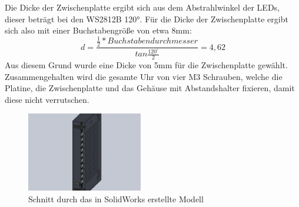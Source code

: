\documentclass[12pt,journal,compsoc]{IEEEtran}
\begin{document}
Die Dicke der Zwischenplatte ergibt sich aus dem Abstrahlwinkel der LEDs, dieser beträgt bei den WS2812B 120°. Für die Dicke der Zwischenplatte ergibt sich also mit einer Buchstabengröße von etwa 8mm: 
\begin{equation}
d = \frac{\frac{1}{2} * Buchstabendurchmesser}{tan\frac{120^\circ }{2}}= 4,62
\end{equation}
Aus diesem Grund wurde eine Dicke von 5mm für die Zwischenplatte gewählt.
Zusammengehalten wird die gesamte Uhr von vier M3 Schrauben, welche die Platine, die Zwischenplatte und das Gehäuse mit Abstandshalter fixieren, damit diese nicht verrutschen.
\begin{figure}[]
	\centering
	\includegraphics[width=0.45\textwidth]{Bilder/SW3}
	\caption{Schnitt durch das in SolidWorks erstellte Modell} 
	\label{fig:SW3}
\end{figure}
\end{document}

